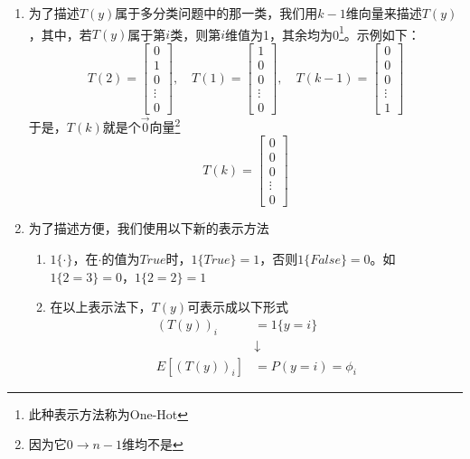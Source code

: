 \begin{enumerate}
	\item 为了描述$T(y)$属于多分类问题中的那一类，我们用$k-1$维向量来描述$T(y)$，其中，若$T(y)$属于第$i$类，则第$i$维值为1，其余均为0\footnote{此种表示方法称为One-Hot}。示例如下：
	\begin{equation}
		T(2) = \left[\begin{matrix} 0 \\ 1 \\ 0 \\ \vdots \\ 0 \end{matrix}\right], \quad
		T(1) = \left[\begin{matrix} 1 \\ 0 \\ 0 \\ \vdots \\ 0 \end{matrix}\right], \quad 
		T(k-1) = \left[\begin{matrix} 0 \\ 0 \\ 0 \\ \vdots \\ 1 \end{matrix}\right]
	\end{equation}
	于是，$T(k)$就是个$\vec{0}$向量\footnote{因为它$0\to n-1$维均不是}
	\begin{equation}
		T(k) = \left[\begin{matrix} 0 \\ 0 \\ 0 \\ \vdots \\ 0 \end{matrix}\right]
	\end{equation}
	\item 为了描述方便，我们使用以下新的表示方法
	\begin{enumerate}
		\item $1\{\cdot\}$，在$\cdot$的值为$True$时，$1\{True\}=1$，否则$1\{False\}=0$。如$1\{2=3\}=0$，$1\{2=2\}=1$
		\item 在以上表示法下，$T(y)$可表示成以下形式
		\begin{align}
			\left(T(y)\right)_i &= 1\{y=i\} \\
			& \downarrow \\
			E\left[\left(T(y)\right)_i\right] &= P(y=i)=\phi_i
		\end{align}
	\end{enumerate}
\end{enumerate}

